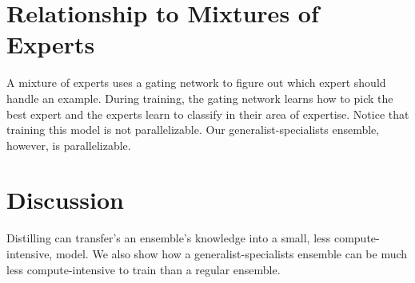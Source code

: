 \documentclass[a4paper]{article}
\begin{document}
\section{Relationship to Mixtures of Experts}
A mixture of experts uses a gating network to figure out which expert should
handle an example. During training, the gating network learns how to pick the
best expert and the experts learn to classify in their area of expertise. Notice
that training this model is not parallelizable. Our generalist-specialists
ensemble, however, is parallelizable.

\section{Discussion}
Distilling can transfer's an ensemble's knowledge into a small, less
compute-intensive, model. We also show how a generalist-specialists ensemble
can be much less compute-intensive to train than a regular ensemble.
\end{document}
